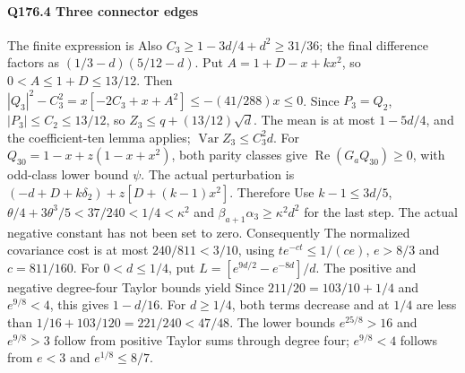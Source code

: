 \paragraph{Q176.4 Three connector edges}\label{part:Q176.4}
The finite expression is
Also $C_3\ge\allowbreak 1-3d/4+d^2\ge\allowbreak 31/36$; the final difference factors as
$(1/3-d)(5/12-d)$.
Put $A=\allowbreak 1+D-x+kx^2$, so $0<\allowbreak A\le\allowbreak 1+D\le\allowbreak 13/12$.
Then $|Q_3|^2-C_3^2=\allowbreak x[-2C_3+x+A^2]\le\allowbreak -(41/288)x\le\allowbreak 0$.
Since $P_3=\allowbreak Q_2$, $|P_3|\le\allowbreak  C_2\le\allowbreak 13/12$, so
$Z_3\le\allowbreak  q+(13/12)\sqrt d$.
The mean is at most $1-5d/4$, and the coefficient-ten lemma applies;
$\operatorname{Var}Z_3\le\allowbreak  C_3^2d$.
For $Q_{30}=\allowbreak 1-x+z(1-x+x^2)$, both parity classes give
$\operatorname{Re}(G_aQ_{30})\ge\allowbreak 0$, with odd-class lower bound $\psi$.
The actual perturbation is
$(-d+D+k\delta_2)+z[D+(k-1)x^2]$.
Therefore
Use $k-1\le\allowbreak 3d/5$,
$\theta/4+3\theta^3/5<\allowbreak 37/240<\allowbreak 1/4<\allowbreak \kappa^2$ and
$\beta_{a+1}\alpha_3\ge\allowbreak \kappa^2d^2$ for the last step.
The actual negative constant has not been set to zero.
Consequently
The normalized covariance cost is at most $240/811<\allowbreak 3/10$, using
$te^{-ct}\le\allowbreak 1/(ce)$, $e>\allowbreak 8/3$ and $c=\allowbreak 811/160$.
For $0<\allowbreak d\le\allowbreak 1/4$, put $L=\allowbreak [e^{9d/2}-e^{-8d}]/d$.
The positive and negative degree-four Taylor bounds yield
Since $211/20=\allowbreak 103/10+1/4$ and $e^{9/8}<\allowbreak 4$, this gives $1-d/16$.
For $d\ge\allowbreak 1/4$, both terms decrease and at $1/4$ are less than
$1/16+103/120=\allowbreak 221/240<\allowbreak 47/48$.
The lower bounds $e^{25/8}>\allowbreak 16$ and $e^{9/8}>\allowbreak 3$ follow from positive
Taylor sums through degree four; $e^{9/8}<\allowbreak 4$ follows from
$e<\allowbreak 3$ and $e^{1/8}\le\allowbreak 8/7$.

